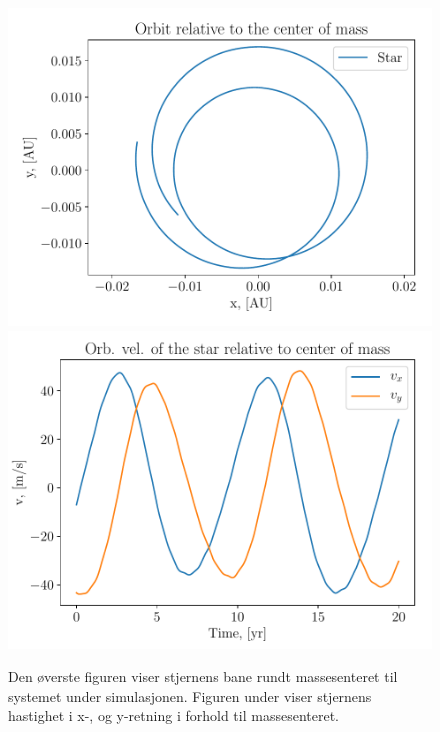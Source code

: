 \documentclass[reprint, english,notitlepage]{revtex4-1}  %
\begin{document}
\begin{figure}
  \includegraphics[width=\linewidth]{../output/plots/orbits_star_cm.pdf}
  \includegraphics[width=\linewidth]{../output/plots/orbital_star_vel_cm.pdf}
  \caption{Den øverste figuren viser stjernens bane rundt massesenteret til systemet under simulasjonen. Figuren under viser stjernens hastighet i x-, og y-retning i forhold til massesenteret.}
  \label{fig:rel_cm}
\end{figure}
\end{document}
